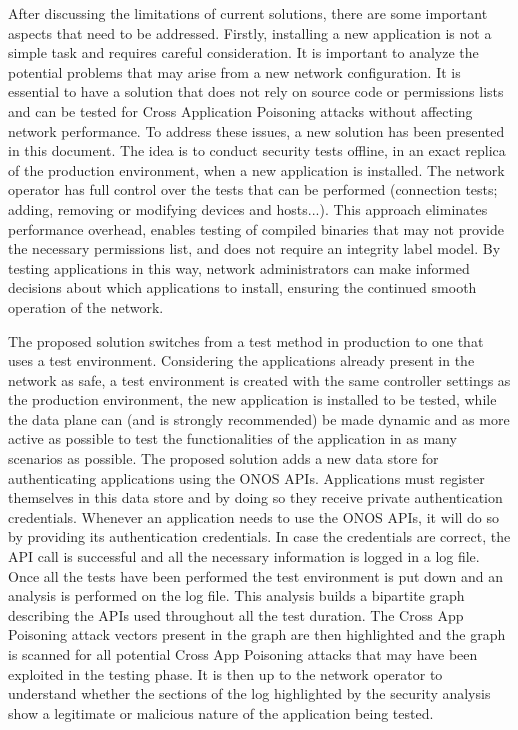 \documentclass[a4paper,10pt]{memoir}
\begin{document}
{%
After discussing the limitations of current solutions, there are some important aspects that need to be addressed. Firstly, installing a new application is not a simple task and requires careful consideration. It is important to analyze the potential problems that may arise from a new network configuration. It is essential to have a solution that does not rely on source code or permissions lists and can be tested for Cross Application Poisoning attacks without affecting network performance. To address these issues, a new solution has been presented in this document. The idea is to conduct security tests offline, in an exact replica of the production environment, when a new application is installed. The network operator has full control over the tests that can be performed (connection tests; adding, removing or modifying devices and hosts...). This approach eliminates performance overhead, enables testing of compiled binaries that may not provide the necessary permissions list, and does not require an integrity label model. By testing applications in this way, network administrators can make informed decisions about which applications to install, ensuring the continued smooth operation of the network.

The proposed solution switches from a test method in production to one that uses a test environment. Considering the applications already present in the network as safe, a test environment is created with the same controller settings as the production environment, the new application is installed to be tested, while the data plane can (and is strongly recommended) be made dynamic and as more active as possible to test the functionalities of the application in as many scenarios as possible. The proposed solution adds a new data store for authenticating applications using the ONOS APIs. Applications must register themselves in this data store and by doing so they receive private authentication credentials. Whenever an application needs to use the ONOS APIs, it will do so by providing its authentication credentials. In case the credentials are correct, the API call is successful and all the necessary information is logged in a log file. Once all the tests have been performed the test environment is put down and an analysis is performed on the log file. This analysis builds a bipartite graph describing the APIs used throughout all the test duration. The Cross App Poisoning attack vectors present in the graph are then highlighted and the graph is scanned for all potential Cross App Poisoning attacks that may have been exploited in the testing phase. It is then up to the network operator to understand whether the sections of the log highlighted by the security analysis show a legitimate or malicious nature of the application being tested.
\medskip

}
\end{document}
